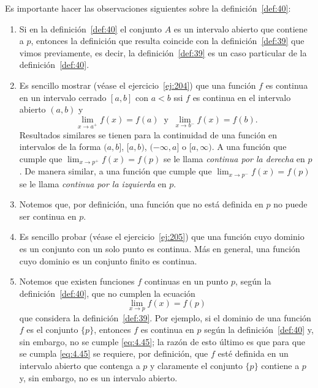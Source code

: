 \documentclass[12pt,a4paper]{book}
\begin{document}
    \begin{observacion}\label{obs:21}
        Es importante hacer las observaciones siguientes sobre la
        definición~\ref{def:40}:
        \begin{enumerate}[label=\arabic*.]
            \item Si en la definición~\ref{def:40} el conjunto $A$ es un intervalo abierto que contiene
            a $p$, entonces la definición que resulta coincide con la definición~\ref{def:39} que
            vimos previamente, es decir, la definición~\ref{def:39} es un caso particular de la
            definición~\ref{def:40}.
            \item Es sencillo mostrar (véase el ejercicio~\ref{ej:204}) que una función $f$ es continua
            en un intervalo cerrado $[a,b]$ con $a<b$ ssi $f$ es continua en el intervalo
            abierto $(a,b)$ y
            \begin{equation*}
                \lim_{x\to a^{+}}f(x)=f(a)\ \text{ y }\ \lim_{x\to b^{-}}f(x)=f(b).
            \end{equation*}
            Resultados similares se tienen para la continuidad de una función en intervalos
            de la forma $(a,b]$, $[a,b)$, $(-\infty,a]$ o $[a,\infty)$. A una función que
            cumple que $\lim_{x\to p^{+}}f(x)=f(p)$ se le llama \textit{continua por la derecha} en
            $p$. De manera similar, a una función que cumple que $\lim_{x\to p^{-}}f(x)=f(p)$
            se le llama \textit{continua por la izquierda} en $p$.
            \item Notemos que, por definición, una función que no está definida en $p$ no
            puede ser continua en $p$.
            \item Es sencillo probar (véase el ejercicio~\ref{ej:205}) que una función cuyo dominio es
            un conjunto con un solo punto es continua. Más en general, una función
            cuyo dominio es un conjunto finito es continua.
            \item Notemos que existen funciones $f$ continuas en un punto $p$, según la definición~\ref{def:40},
            que no cumplen la ecuación
            \begin{equation}\label{eq:4.45}
                \lim_{x\to p}f(x)=f(p)
            \end{equation}
            que considera la definición~\ref{def:39}. Por ejemplo, si el dominio de una función
            $f$ es el conjunto $\{p\}$, entonces $f$ es continua en $p$ según la definición~\ref{def:40}
            y, sin embargo, no se cumple \eqref{eq:4.45}; la razón de esto último es que para
            que se cumpla \eqref{eq:4.45} se requiere, por definición, que $f$ esté definida en un
            intervalo abierto que contenga a $p$ y claramente el conjunto $\{p\}$ contiene
            a $p$ y, sin embargo, no es un intervalo abierto.
        \end{enumerate}
    \end{observacion}
\end{document}
